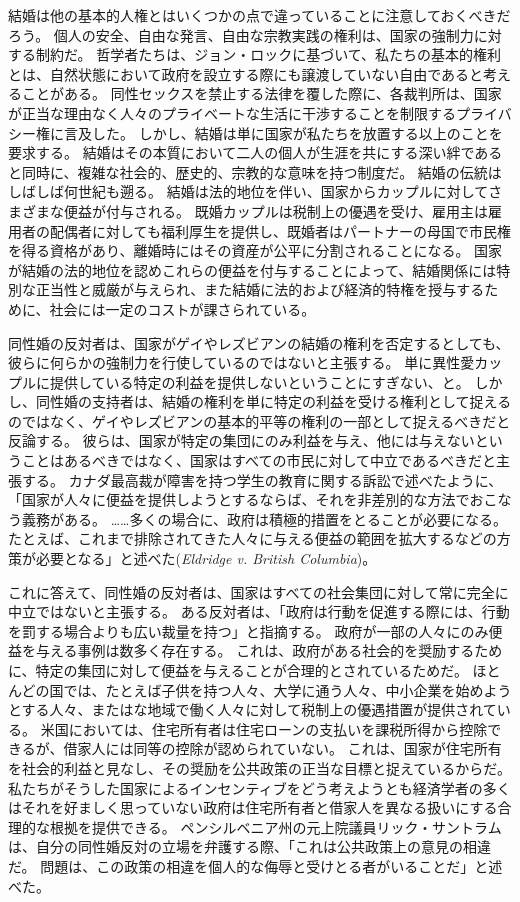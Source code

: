 \documentclass[paper=a4,book,openany]{jlreq} \usepackage{mystyle}
\begin{document}
結婚は他の基本的人権とはいくつかの点で違っていることに注意しておくべきだろう。
個人の安全、自由な発言、自由な宗教実践の権利は、国家の強制力に対する制約だ。
哲学者たちは、ジョン・ロックに基づいて、私たちの基本的権利とは、自然状態において政府を設立する際にも譲渡していない自由であると考えることがある。
同性セックスを禁止する法律を覆した際に、各裁判所は、国家が正当な理由なく人々のプライベートな生活に干渉することを制限するプライバシー権に言及した。
しかし、結婚は単に国家が私たちを放置する以上のことを要求する。
結婚はその本質において二人の個人が生涯を共にする深い絆であると同時に、複雑な社会的、歴史的、宗教的な意味を持つ制度だ。
結婚の伝統はしばしば何世紀も遡る。
結婚は法的地位を伴い、国家からカップルに対してさまざまな便益が付与される。
既婚カップルは税制上の優遇を受け、雇用主は雇用者の配偶者に対しても福利厚生を提供し、既婚者はパートナーの母国で市民権を得る資格があり、離婚時にはその資産が公平に分割されることになる。
国家が結婚の法的地位を認めこれらの便益を付与することによって、結婚関係には特別な正当性と威厳が与えられ、また結婚に法的および経済的特権を授与するために、社会には一定のコストが課さられている。

同性婚の反対者は、国家がゲイやレズビアンの結婚の権利を否定するとしても、彼らに何らかの強制力を行使しているのではないと主張する。
単に異性愛カップルに提供している特定の利益を提供しないということにすぎない、と。
しかし、同性婚の支持者は、結婚の権利を単に特定の利益を受ける権利として捉えるのではなく、ゲイやレズビアンの基本的平等の権利の一部として捉えるべきだと反論する。
彼らは、国家が特定の集団にのみ利益を与え、他には与えないということはあるべきではなく、国家はすべての市民に対して中立であるべきだと主張する。
カナダ最高裁が障害を持つ学生の教育に関する訴訟で述べたように、「国家が人々に便益を提供しようとするならば、それを非差別的な方法でおこなう義務がある。
……多くの場合に、政府は積極的措置をとることが必要になる。
たとえば、これまで排除されてきた人々に与える便益の範囲を拡大するなどの方策が必要となる」と述べた(\emph{Eldridge v. British Columbia})。

これに答えて、同性婚の反対者は、国家はすべての社会集団に対して常に完全に中立ではないと主張する。
ある反対者は、「政府は行動を促進する際には、行動を罰する場合よりも広い裁量を持つ」と指摘する\citep[p.607]{dent99:_defen_tradit_marriag}。
政府が一部の人々にのみ便益を与える事例は数多く存在する。
これは、政府がある社会的を奨励するために、特定の集団に対して便益を与えることが合理的とされているためだ。
ほとんどの国では、たとえば子供を持つ人々、大学に通う人々、中小企業を始めようとする人々、またはな地域で働く人々に対して税制上の優遇措置が提供されている。
米国においては、住宅所有者は住宅ローンの支払いを課税所得から控除できるが、借家人には同等の控除が認められていない。
これは、国家が住宅所有を社会的利益と見なし、その奨励を公共政策の正当な目標と捉えているからだ。
私たちがそうした国家によるインセンティブをどう考えようとも{\DDASH}経済学者の多くはそれを好ましく思っていない{\DDASH}政府は住宅所有者と借家人を異なる扱いにする合理的な根拠を提供できる。
ペンシルベニア州の元上院議員リック・サントラムは、自分の同性婚反対の立場を弁護する際、「これは公共政策上の意見の相違だ。
問題は、この政策の相違を個人的な侮辱と受けとる者がいることだ」と述べた\citep{villalva12:_gay_activ_rebuk_bully_santor}。
\end{document}
